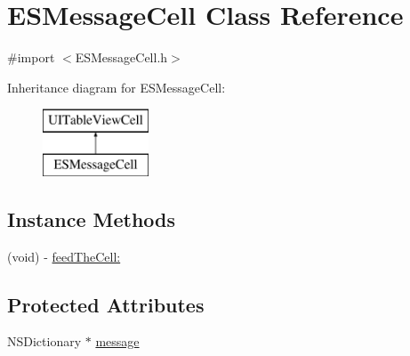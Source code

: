 \hypertarget{interface_e_s_message_cell}{}\section{E\+S\+Message\+Cell Class Reference}
\label{interface_e_s_message_cell}


{\ttfamily \#import $<$E\+S\+Message\+Cell.\+h$>$}

Inheritance diagram for E\+S\+Message\+Cell\+:\begin{figure}[H]
\begin{center}
\leavevmode
\includegraphics[height=2.000000cm]{interface_e_s_message_cell}
\end{center}
\end{figure}
\subsection*{Instance Methods}
\begin{DoxyCompactItemize}
\item 
(void) -\/ \hyperlink{interface_e_s_message_cell_a4e2cb89368404ce1687fa85c052db4c6}{feed\+The\+Cell\+:}
\end{DoxyCompactItemize}
\subsection*{Protected Attributes}
\begin{DoxyCompactItemize}
\item 
N\+S\+Dictionary $\ast$ \hyperlink{interface_e_s_message_cell_a232fa8c6450078d057e6da54fe61e2e9}{message}
\end{DoxyCompactItemize}
